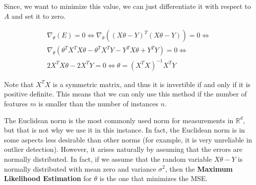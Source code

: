 \documentclass{article}
\newcommand{\R}{\mathbb{R}}
\begin{document}
Since, we want to minimize this value, we can just differentiate it with respect to $A$ and set it to zero.

\begin{gather*}
\nabla_\theta (E) = 0 \Leftrightarrow 
\nabla_\theta  \left( (X \theta - Y)^T(X \theta - Y) \right) = 0 \Leftrightarrow \\
\nabla_\theta  \left( \theta^T X^T X \theta - \theta^T X^T Y - Y^T X \theta + Y^T Y \right) = 0 \Leftrightarrow \\
2 X^T X \theta - 2 X^T Y = 0 \Leftrightarrow 
\theta = (X^T X)^{-1} X^T Y
\end{gather*}

Note that $X^T X$ is a symmetric matrix, and thus it is invertible if and only if it is positive definite.
This means that we can only use this method if the number of features $m$ is smaller than the number of instances $n$.

The Euclidean norm is the most commonly used norm for measurements in $\R^d$, but that is not why we use it in this instance.
In fact, the Euclidean norm is in some aspects less desirable than other norms (for example, it is very unreliable in outlier detection).
However, it arises naturally by assuming that the errors are normally distributed.
In fact, if we assume that the random variable $X \theta - Y$ is normally distributed with mean zero and variance $\sigma^2$, then the \textbf{Maximum Likelihood Estimation} for $\theta$ is the one that minimizes the MSE.
\end{document}
